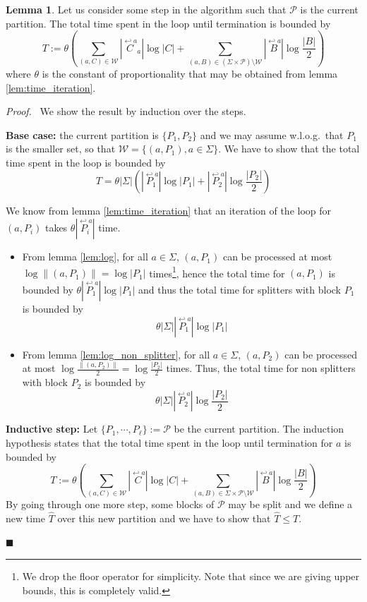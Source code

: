 \documentclass[12pt, a4 paper]{article}
\renewenvironment{proof}[1][Proof]{\begin{mdframed}[backgroundcolor=black!5, topline=false, rightline=false, bottomline=false, linecolor=black!15, linewidth=3pt]{\noindent\textit{#1.}\ }}{\noindent\par\hfill$\blacksquare$\end{mdframed}}
\theoremstyle{definition}
\newtheorem{lemma}{Lemma}
\begin{document}
\begin{lemma}\label{lem:bound}
    Let us consider some step in the algorithm such that $\mathcal{P}$ is the current partition.
    The total time spent in the loop until termination is bounded by
    $$ T := \theta \left(\sum_{(a, C) \in \mathcal{W}} | \overset{\hookleftarrow a}{C}_a | \log | C | + \sum_{(a, B) \in (\Sigma\times \mathcal{P})\setminus \mathcal{W}} | \overset{\hookleftarrow a}{B} | \log \frac{| B |}{2} \right)$$
    where $\theta$ is the constant of proportionality that may be obtained from lemma \ref{lem:time_iteration}.
\end{lemma}
\begin{proof}
    We show the result by induction over the steps.

    \bigskip
    \textbf{Base case:} the current partition is $\{P_1, P_2\}$ and we may assume w.l.o.g.\ that $P_1$ is the smaller set, so that $\mathcal{W} = \{(a, P_1), a \in \Sigma\}$.
    We have to show that the total time spent in the loop is bounded by
    $$T = \theta |\Sigma| \left(| \overset{\hookleftarrow a}{P_1} | \log | P_1 | + | \overset{\hookleftarrow a}{P_2} | \log \frac{| P_2 |}{2}\right)$$
    
    We know from lemma \ref{lem:time_iteration} that an iteration of the loop for $(a, P_i)$ takes $\theta | \overset{\hookleftarrow a}{P_i} | $ time.
    \begin{itemize}
        \item From lemma \ref{lem:log}, for all $a\in\Sigma$, $(a, P_1)$ can be processed at most $\log \| (a, P_1) \| = \log |P_1|$ times\footnote{We drop the floor operator for simplicity.
        Note that since we are giving upper bounds, this is completely valid.}, hence the total time for $(a, P_1)$ is bounded by $\theta | \overset{\hookleftarrow a}{P_1} | \log | P_1 |$ and thus the total time for splitters with block $P_1$ is bounded by
        $$\theta |\Sigma| | \overset{\hookleftarrow a}{P_1} | \log | P_1 |$$

        \item From lemma \ref{lem:log_non_splitter}, for all $a\in\Sigma$, $(a, P_2)$ can be processed at most $\log \frac{\| (a, P_2) \|}{2} = \log \frac{| P_2 |}{2}$ times. Thus, the total time for non splitters with block $P_2$ is bounded by
        $$ \theta |\Sigma| | \overset{\hookleftarrow a}{P_2} | \log \frac{| P_2 |}{2}$$
    \end{itemize}
    
    \textbf{Inductive step:} Let $\{P_1, \cdots, P_\ell\} := \mathcal{P}$ be the current partition.
    The induction hypothesis states that the total time spent in the loop until termination for $a$ is bounded by
    $$ T := \theta \left(\sum_{(a, C) \in \mathcal{W}} | \overset{\hookleftarrow a}{C} | \log | C | + \sum_{(a, B) \in \Sigma\times \mathcal{P}\setminus \mathcal{W}} | \overset{\hookleftarrow a}{B} | \log \frac{| B |}{2} \right)$$
    By going through one more step, some blocks of $\mathcal{P}$ may be split and we define a new time $\hat{T}$ over this new partition and we have to show that $\hat{T} \leq T$.


\end{proof}
\end{document}
